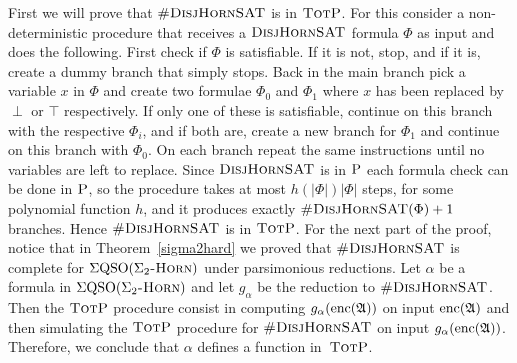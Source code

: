 First we will prove that $\textsc{\#DisjHornSAT}$ is in $\text{\sc TotP}$. For this consider a non-deterministic procedure that receives a $\textsc{DisjHornSAT}$ formula $\Phi$ as input and does the following. First check if $\Phi$ is satisfiable. If it is not, stop, and if it is, create a dummy branch that simply stops. Back in the main branch pick a variable $x$ in $\Phi$ and create two formulae $\Phi_0$ and $\Phi_1$ where $x$ has been replaced by $\perp$ or $\top$ respectively. If only one of these is satisfiable, continue on this branch with the respective $\Phi_i$, and if both are, create a new branch for $\Phi_1$ and continue on this branch with $\Phi_0$. On each branch repeat the same instructions until no variables are left to replace. Since $\textsc{DisjHornSAT}$ is in $\text{\sc P}$ each formula check can be done in $\text{\sc P}$, so the procedure takes at most $h(\vert\Phi\vert)\vert\Phi\vert$ steps, for some polynomial function $h$, and it produces exactly $\textsc{\#DisjHornSAT}(\Phi)+1$ branches. Hence $\textsc{\#DisjHornSAT}$ is in $\text{\sc TotP}$. For the next part of the proof, notice that in Theorem~\ref{sigma2hard} we proved that $\textsc{\#DisjHornSAT}$ is complete for $\Sigma{\rm QSO}(\Sigma_2\textsc{-Horn})$ under parsimonious reductions. Let $\alpha$ be a formula in $\Sigma{\rm QSO}(\Sigma_2\textsc{-Horn})$ and let $g_{\alpha}$ be the reduction to $\textsc{\#DisjHornSAT}$. Then the $\text{\sc TotP}$ procedure consist in computing $g_{\alpha}({\rm enc}(\mathfrak{A}))$ on input ${\rm enc}(\mathfrak{A})$ and then simulating the $\text{\sc TotP}$ procedure for $\textsc{\#DisjHornSAT}$ on input $g_{\alpha}({\rm enc}(\mathfrak{A}))$. Therefore, we conclude that $\alpha$ defines a function in~$\text{\sc TotP}$.
